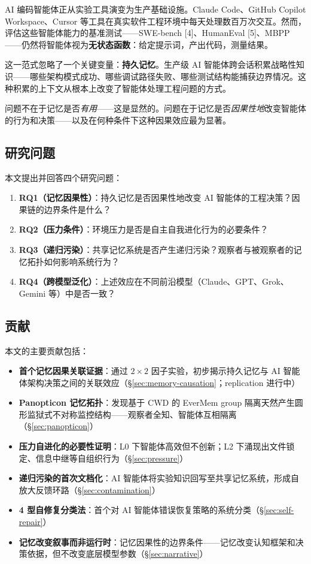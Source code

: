 \documentclass[11pt, a4paper]{article}
\begin{document}
AI 编码智能体正从实验工具演变为生产基础设施。Claude Code、GitHub Copilot Workspace、Cursor 等工具在真实软件工程环境中每天处理数百万次交互。然而，评估这些智能体能力的基准测试——SWE-bench [4]、HumanEval [5]、MBPP——仍然将智能体视为\textbf{无状态函数}：给定提示词，产出代码，测量结果。

这一范式忽略了一个关键变量：\textbf{持久记忆}。生产级 AI 智能体跨会话积累战略性知识——哪些架构模式成功、哪些调试路径失败、哪些测试结构能捕获边界情况。这种积累的上下文从根本上改变了智能体处理工程问题的方式。

问题不在于记忆是否\textit{有用}——这是显然的。问题在于记忆是否\textit{因果性地}改变智能体的行为和决策——以及在何种条件下这种因果效应最为显著。

\subsection{研究问题}

本文提出并回答四个研究问题：

\begin{enumerate}
  \item \textbf{RQ1（记忆因果性）}：持久记忆是否因果性地改变 AI 智能体的工程决策？因果链的边界条件是什么？
  \item \textbf{RQ2（压力条件）}：环境压力是否是自主自我进化行为的必要条件？
  \item \textbf{RQ3（递归污染）}：共享记忆系统是否产生递归污染？观察者与被观察者的记忆拓扑如何影响系统行为？
  \item \textbf{RQ4（跨模型泛化）}：上述效应在不同前沿模型（Claude、GPT、Grok、Gemini 等）中是否一致？
\end{enumerate}

\subsection{贡献}

本文的主要贡献包括：

\begin{itemize}
  \item \textbf{首个记忆因果关联证据}：通过 $2 \times 2$ 因子实验，初步揭示持久记忆与 AI 智能体架构决策之间的关联效应（\S\ref{sec:memory-causation}；replication 进行中）
  \item \textbf{Panopticon 记忆拓扑}：发现基于 CWD 的 EverMem group 隔离天然产生圆形监狱式不对称监控结构——观察者全知、智能体互相隔离（\S\ref{sec:panopticon}）
  \item \textbf{压力自进化的必要性证明}：L0 下智能体高效但不创新；L2 下涌现出文件锁定、信息中继等自组织行为（\S\ref{sec:pressure}）
  \item \textbf{递归污染的首次文档化}：AI 智能体将实验知识回写至共享记忆系统，形成自放大反馈环路（\S\ref{sec:contamination}）
  \item \textbf{4 型自修复分类法}：首个对 AI 智能体错误恢复策略的系统分类（\S\ref{sec:self-repair}）
  \item \textbf{记忆改变叙事而非运行时}：记忆因果性的边界条件——记忆改变认知框架和决策依据，但不改变底层模型参数（\S\ref{sec:narrative}）
\end{itemize}
\end{document}
